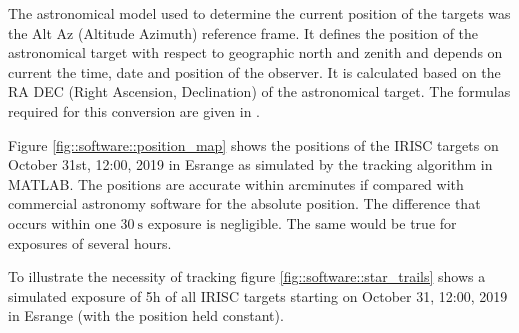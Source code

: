 The astronomical model used to determine the current position of the targets was the Alt Az (Altitude Azimuth) reference frame. It defines the position of the astronomical target with respect to geographic north and zenith and depends on current the time, date and position of the observer. It is calculated based on the RA DEC (Right Ascension, Declination) of the astronomical target. The formulas required for this conversion are given in \mbox{\cite{RaDec2AltAz}}.

Figure \mbox{\ref{fig::software::position_map}} shows the positions of the IRISC targets on October 31st, 12:00, 2019 in Esrange as simulated by the tracking algorithm in MATLAB. The positions are accurate within arcminutes if compared with commercial astronomy software for the absolute position. The difference that occurs within one $\SI{30}{\s}$ exposure is negligible. The same would be true for exposures of several hours.

To illustrate the necessity of tracking figure \mbox{\ref{fig::software::star_trails}} shows a simulated exposure of 5h of all IRISC targets starting on October 31, 12:00, 2019 in Esrange (with the position held constant). 

